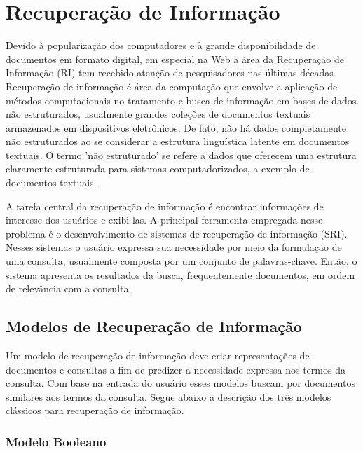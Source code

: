
\section{Recuperação de Informação}


Devido à popularização dos computadores e à grande disponibilidade de documentos em formato digital, em especial na Web a área da Recuperação de Informação (RI) tem recebido atenção de pesquisadores nas últimas décadas.
% 
Recuperação de informação é área da computação que envolve a aplicação de métodos computacionais no tratamento e busca de informação em bases de dados não estruturados, usualmente grandes coleções de documentos textuais armazenados em dispositivos eletrônicos. De fato, não há dados completamente não estruturados ao se considerar a estrutura linguística latente em documentos textuais. O termo 'não estruturado' se refere a dados que oferecem uma estrutura claramente estruturada para sistemas computadorizados, a exemplo de documentos 
textuais~\cite{Manning2008}.

A tarefa central da recuperação de informação é encontrar informações de interesse dos usuários e exibi-las. A principal ferramenta empregada nesse problema é o desenvolvimento de sistemas de recuperação de informação (SRI). Nesses sistemas o usuário expressa sua necessidade por meio da formulação de uma consulta, usualmente composta por um conjunto de palavras-chave. Então, o sistema apresenta os resultados da busca, frequentemente documentos, em ordem de relevância com a consulta.



\subsection{Modelos de Recuperação de Informação}

Um modelo de recuperação de informação deve criar representações de documentos e consultas a fim de predizer a necessidade expressa nos termos da consulta. Com base na entrada do usuário esses modelos buscam por documentos similares aos termos da consulta. Segue abaixo a descrição dos três modelos clássicos para recuperação de informação.

\subsubsection{Modelo Booleano}

